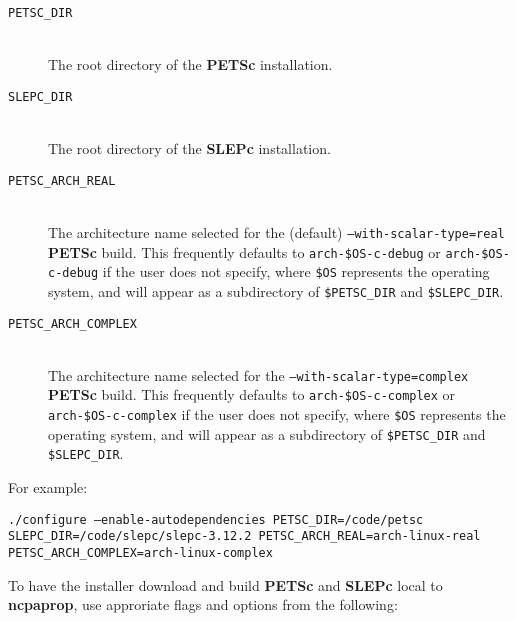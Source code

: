 \begin{description}
\item[\texttt{PETSC\_DIR}]\hfill \\
\noindent
The root directory of the \textbf{PETSc} installation.

\item[\texttt{SLEPC\_DIR}]\hfill \\
\noindent
The root directory of the \textbf{SLEPc} installation.

\item[\texttt{PETSC\_ARCH\_REAL}]\hfill \\
\noindent
The architecture name selected for the (default) \texttt{--with-scalar-type=real} \textbf{PETSc} build.  This frequently defaults to \texttt{arch-\$OS-c-debug} or \texttt{arch-\$OS-c-debug} if the user does not specify, where \texttt{\$OS} represents the operating system, and will appear as a subdirectory of \texttt{\$PETSC\_DIR} and \texttt{\$SLEPC\_DIR}.

\item[\texttt{PETSC\_ARCH\_COMPLEX}]\hfill \\
\noindent
The architecture name selected for the \texttt{--with-scalar-type=complex} \textbf{PETSc} build.  This frequently defaults to \texttt{arch-\$OS-c-complex} or \texttt{arch-\$OS-c-complex} if the user does not specify, where \texttt{\$OS} represents the operating system, and will appear as a subdirectory of \texttt{\$PETSC\_DIR} and \texttt{\$SLEPC\_DIR}.
\end{description}

\noindent For example:

\noindent \texttt{./configure --enable-autodependencies PETSC\_DIR=/code/petsc SLEPC\_DIR=/code/slepc/slepc-3.12.2 PETSC\_ARCH\_REAL=arch-linux-real PETSC\_ARCH\_COMPLEX=arch-linux-complex}

\noindent To have the installer download and build \textbf{PETSc} and \textbf{SLEPc} local to \textbf{ncpaprop}, use approriate flags and options from the following:

